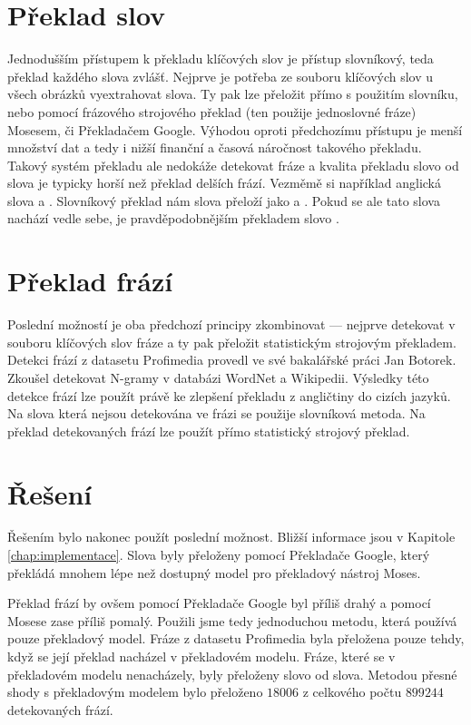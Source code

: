 \section{Překlad slov}

Jednodušším přístupem k překladu klíčových slov je přístup slovníkový, teda překlad každého slova zvlášť. Nejprve je potřeba ze souboru klíčových slov u všech obrázků vyextrahovat slova. Ty pak lze přeložit přímo s použitím slovníku, nebo pomocí frázového strojového překlad (ten použije jednoslovné fráze) Mosesem, či Překladačem Google. Výhodou oproti předchozímu přístupu je menší množství dat a tedy i nižší finanční a časová náročnost takového překladu. Takový systém překladu ale nedokáže detekovat fráze a kvalita překladu slovo od slova je typicky horší než překlad delších frází. Vezměmě si například anglická slova  a . Slovníkový překlad nám slova přeloží jako  a . Pokud se ale tato slova nachází vedle sebe, je pravděpodobnějším překladem slovo .

\section{Překlad frází}

Poslední možností je oba předchozí principy zkombinovat --- nejprve detekovat v souboru klíčových slov fráze a ty pak přeložit statistickým strojovým překladem. Detekci frází z datasetu Profimedia provedl ve své bakalářské práci\cite{botorek} Jan Botorek. Zkoušel detekovat N-gramy v databázi WordNet\cite{wordnet} a Wikipedii. Výsledky této detekce frází lze použít právě ke zlepšení překladu z angličtiny do cizích jazyků. Na slova která nejsou detekována ve frázi se použije slovníková metoda. Na překlad detekovaných frází lze použít přímo statistický strojový překlad.


\section{Řešení}

Řešením bylo nakonec použít poslední možnost. Bližší informace jsou v Kapitole \ref{chap:implementace}. Slova byly přeloženy pomocí Překladače Google, který překládá mnohem lépe než dostupný model pro překladový nástroj Moses.

Překlad frází by ovšem pomocí Překladače Google byl příliš drahý a pomocí Mosese zase příliš pomalý. Použili jsme tedy jednoduchou metodu, která používá pouze překladový model. Fráze z datasetu Profimedia byla přeložena pouze tehdy, když se její překlad nacházel v překladovém modelu. Fráze, které se v překladovém modelu nenacházely, byly přeloženy slovo od slova. Metodou přesné shody s překladovým modelem bylo přeloženo $18 006$ z celkového počtu $899 244$ detekovaných frází.

